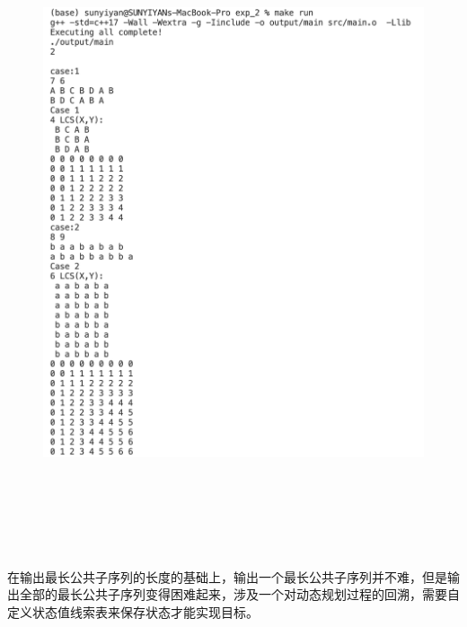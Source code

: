 \newpage

\subsection*{}


\begin{code}
    
\end{code}

\subsection*{}

\begin{figure}[htbp]
    \centering
    \includegraphics[height=18cm]{figure/run_time_3.png}
  \end{figure} 

\subsection*{}
在输出最长公共子序列的长度的基础上，输出一个最长公共子序列并不难，但是输出全部的最长公共子序列变得困难起来，涉及一个对动态规划过程的回溯，需要自定义状态值线索表来保存状态才能实现目标。


\newpage

